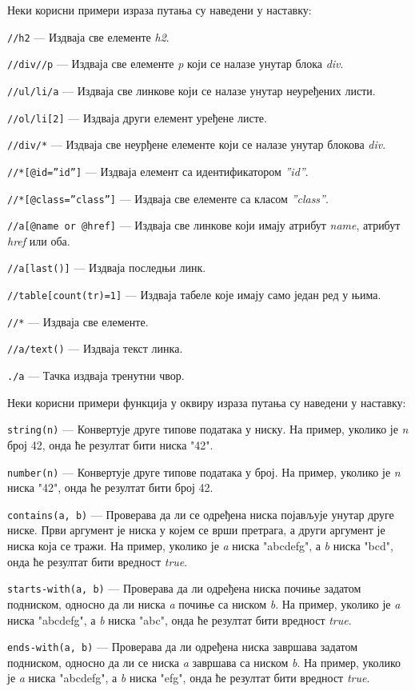 \documentclass[12pt,oneside]{memoir}
\begin{document}
Неки корисни примери израза путања су наведени у наставку:
\begin{description}
\item \texttt{//h2} --- Издваја све елементе \textit{h2}.
\item \texttt{//div//p} --- Издваја све елементе \textit{p} који се налазе унутар блока \textit{div}.
\item \texttt{//ul/li/a} --- Издваја све линкове који се налазе унутар неуређених листи.
\item \texttt{//ol/li[2]} --- Издваја други елемент уређене листе.
\item \texttt{//div/*} --- Издваја све неурђене елементе који се налазе унутар блокова \textit{div}.
\item \texttt{//*[@id=''id'']} --- Издваја елемент са идентификатором \textit{''id''}.
\item \texttt{//*[@class=''class'']} --- Издваја све елементе са класом \textit{''class''}.
\item \texttt{//a[@name or @href]} --- Издваја све линкове који имају атрибут \textit{name}, атрибут \textit{href} или оба.
\item \texttt{//a[last()]} --- Издваја последњи линк.
\item \texttt{//table[count(tr)=1]} --- Издваја табеле које имају само један ред у њима.
\item \texttt{//*} --- Издваја све елементе.
\item \texttt{//a/text()} --- Издваја текст линка.
\item \texttt{./a} --- Тачка издваја тренутни чвор.
\end{description}

Неки корисни примери функција у оквиру израза путања су наведени у наставку:
\begin{description}
\item \texttt{string(n)} --- Конвертује друге типове података у ниску. На пример, уколико је \textit{n} број 42, онда ће резултат бити ниска "42".
\item \texttt{number(n)} --- Конвертује друге типове података у број. На пример, уколико је \textit{n} ниска "42", онда ће резултат бити број 42.
\item \texttt{contains(a, b)} --- Проверава да ли се одређена ниска појављује унутар друге ниске. Први аргумент је ниска у којем се врши претрага, а други аргумент је ниска која се тражи. На пример, уколико је \textit{a} ниска "abcdefg", а \textit{b} ниска "bcd", онда ће резултат бити вредност \textit{true}.
\item \texttt{starts-with(a, b)} --- Проверава да ли одређена ниска почиње задатом подниском, односно да ли ниска \textit{a} почиње са ниском \textit{b}.
На пример, уколико је \textit{a} ниска "abcdefg", а \textit{b} ниска "abc", онда ће резултат бити вредност \textit{true}.
\item \texttt{ends-with(a, b)} --- Проверава да ли одређена ниска завршава задатом подниском, односно да ли се ниска \textit{a} завршава са ниском \textit{b}.
На пример, уколико је \textit{a} ниска "abcdefg", а \textit{b} ниска "efg", онда ће резултат бити вредност \textit{true}.
\end{description}
\end{document}
